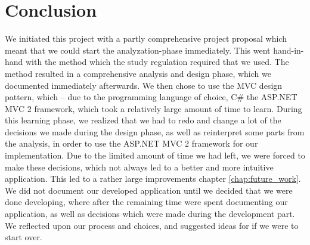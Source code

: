 \chapter{Conclusion}
\label{chap:conclusion}

We initiated this project with a partly comprehensive project proposal which meant that we could start the analyzation-phase immediately. This went hand-in-hand with the \ooad{} method which the study regulation required that we used. The \ooad{} method resulted in a comprehensive analysis and design phase, which we documented immediately afterwards. We then chose to use the MVC design pattern, which -- due to the programming language of choice, C\# the ASP.NET MVC 2 framework, which took a relatively large amount of time to learn. During this learning phase, we realized that we had to redo and change a lot of the decisions we made during the design phase, as well as reinterpret some parts from the analysis, in order to use the ASP.NET MVC 2 framework for our implementation. Due to the limited amount of time we had left, we were forced to make these decisions, which not always led to a better and more intuitive application. This led to a rather large improvements chapter \ref{chap:future_work}. We did not document our developed application until we decided that we were done developing, where after the remaining time were spent documenting our application, as well as decisions which were made during the development part. We reflected upon our process and choices, and suggested ideas for if we were to start over.








